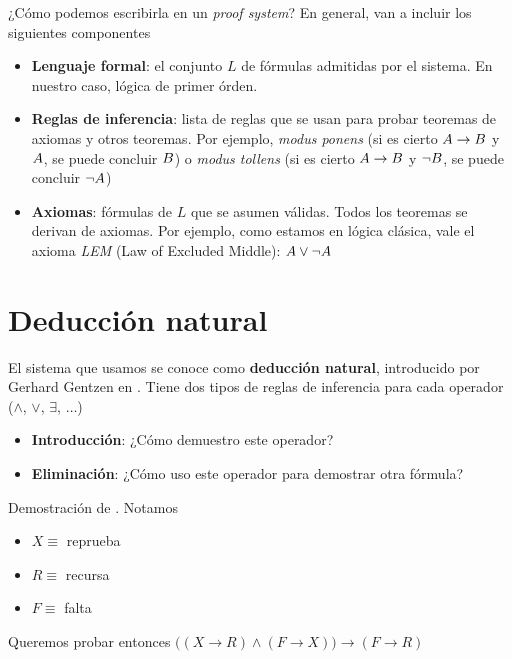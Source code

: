 ¿Cómo podemos escribirla en un \textit{proof system}? En general, van a incluir
los siguientes componentes

\begin{itemize}
    \item \textbf{Lenguaje formal}: el conjunto $L$ de fórmulas admitidas por
    el sistema. En nuestro caso, lógica de primer órden.
    \item \textbf{Reglas de inferencia}: lista de reglas que se usan para probar
    teoremas de axiomas y otros teoremas. Por ejemplo, \textit{modus ponens} (si
    es cierto $A \rightarrow B$ y $A$, se puede concluir $B$) o
    \textit{modus tollens} (si es cierto $A \rightarrow B$ y $\neg
    B$, se puede concluir $\neg A$)
    \item \textbf{Axiomas}: fórmulas de $L$ que se asumen válidas. Todos los
    teoremas se derivan de axiomas. Por ejemplo, como estamos en lógica clásica,
    vale el axioma \textit{LEM} (Law of Excluded Middle): $A \vee \neg A$
\end{itemize}

\section{Deducción natural}

El sistema que usamos se conoce como \textbf{deducción natural}, introducido por
Gerhard Gentzen en \cite{gentzen-1935} . Tiene dos tipos de
reglas de inferencia para cada operador ($\wedge$, $\vee$, $\exists$, $\dots$)

\begin{itemize}
    \item \textbf{Introducción}: ¿Cómo demuestro este operador?
    \item \textbf{Eliminación}: ¿Cómo uso este operador para demostrar otra fórmula?
\end{itemize}

\begin{ejemplo}
    Demostración de . Notamos
    \begin{itemize}
        \item $X \equiv$ reprueba
        \item $R \equiv$ recursa
        \item $F \equiv$ falta
    \end{itemize}

    Queremos probar entonces 
    \(
        \Big(
            (X \rightarrow R) \wedge (F \rightarrow X)
        \Big)
        \rightarrow
        (F \rightarrow R)
    \)

\end{ejemplo}

